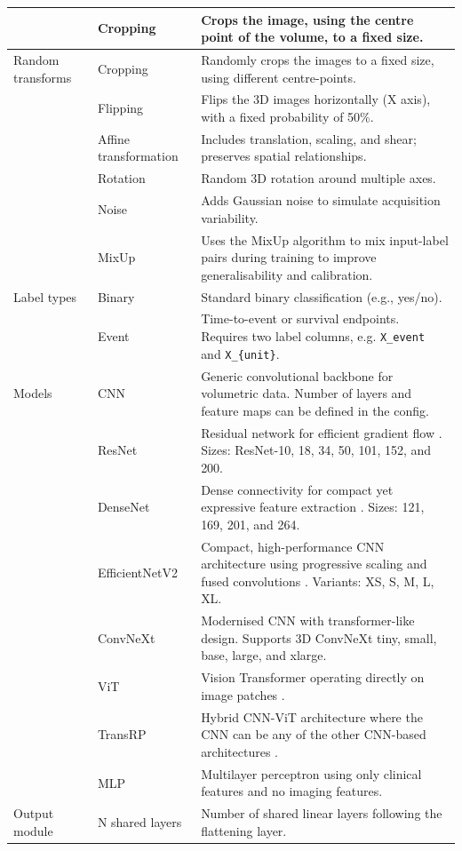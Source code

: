 \documentclass[11pt]{article}
\begin{document}
\begin{longtable}{P{0.16\textwidth}P{0.18\textwidth}P{0.58\textwidth}}
 & Cropping & Crops the image, using the centre point of the volume, to a fixed size. \\
\hline
Random transforms & Cropping & Randomly crops the images to a fixed size, using different centre-points. \\
 & Flipping & Flips the 3D images horizontally (X axis), with a fixed probability of 50\%. \\
 & Affine transformation & Includes translation, scaling, and shear; preserves spatial relationships. \\
 & Rotation & Random 3D rotation around multiple axes. \\
 & Noise & Adds Gaussian noise to simulate acquisition variability. \\
 & MixUp & Uses the MixUp algorithm \cite{Zhang2018} to mix input-label pairs during training to improve generalisability and calibration. \\
\hline
Label types & Binary & Standard binary classification (e.g., yes/no). \\
 & Event & Time-to-event or survival endpoints. Requires two label columns, e.g. \texttt{X\_event} and \texttt{X\_\{unit\}}. \\
\hline
Models & CNN & Generic convolutional backbone for volumetric data. Number of layers and feature maps can be defined in the config. \\
 & ResNet & Residual network for efficient gradient flow \cite{He2015}. Sizes: ResNet-10, 18, 34, 50, 101, 152, and 200. \\
 & DenseNet & Dense connectivity for compact yet expressive feature extraction \cite{Huang2018}. Sizes: 121, 169, 201, and 264. \\
 & EfficientNetV2 & Compact, high-performance CNN architecture using progressive scaling and fused convolutions \cite{Tan2021}. Variants: XS, S, M, L, XL. \\
 & ConvNeXt & Modernised CNN with transformer-like design. Supports 3D ConvNeXt tiny, small, base, large, and xlarge. \\
 & ViT & Vision Transformer operating directly on image patches \cite{Dosovitskiy2021}. \\
 & TransRP & Hybrid CNN-ViT architecture where the CNN can be any of the other CNN-based architectures \cite{Ma2023}. \\
 & MLP & Multilayer perceptron using only clinical features and no imaging features. \\
\hline
Output module & N shared layers & Number of shared linear layers following the flattening layer. \\

\end{longtable}
\end{document}
